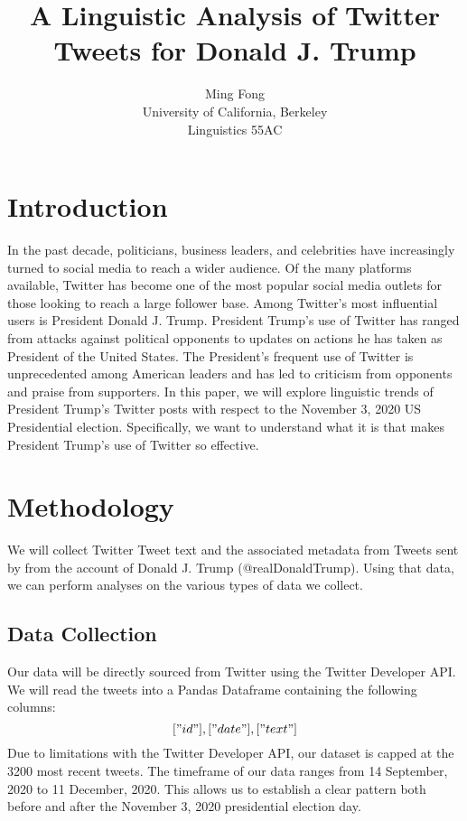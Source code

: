 \documentclass[11pt]{article} %
\title{A Linguistic Analysis of Twitter Tweets for Donald J. Trump}
\author{Ming Fong\\
University of California, Berkeley\\
Linguistics 55AC}
\begin{document}
\maketitle

\section{Introduction}

In the past decade, politicians, business leaders, and celebrities have increasingly turned to social media to reach a wider audience.
Of the many platforms available, Twitter has become one of the most popular social media outlets for those looking to reach a large follower base.
Among Twitter's most influential users is President Donald J. Trump.
President Trump's use of Twitter has ranged from attacks against political opponents to updates on actions he has taken as President of the United States.
The President's frequent use of Twitter is unprecedented among American leaders and has led to criticism from opponents and praise from supporters.
In this paper, we will explore linguistic trends of President Trump's Twitter posts with respect to the November 3, 2020 US Presidential election.
Specifically, we want to understand what it is that makes President Trump's use of Twitter so effective.

\section{Methodology}

We will collect Twitter Tweet text and the associated metadata from Tweets sent by from the account of Donald J. Trump (@realDonaldTrump).
Using that data, we can perform analyses on the various types of data we collect.

\subsection{Data Collection}

Our data will be directly sourced from Twitter using the Twitter Developer API.
We will read the tweets into a Pandas Dataframe containing the following columns:
$$["id"], ["date"], ["text"]$$
Due to limitations with the Twitter Developer API, our dataset is capped at the 3200 most recent tweets.
The timeframe of our data ranges from 14 September, 2020 to 11 December, 2020.
This allows us to establish a clear pattern both before and after the November 3, 2020 presidential election day.
\end{document}
